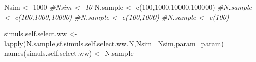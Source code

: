 \documentclass[
]{book}
\newenvironment{Shaded}{\begin{snugshade}}{\end{snugshade}}
\newcommand{\AttributeTok}[1]{\textcolor[rgb]{0.77,0.63,0.00}{#1}}
\newcommand{\CommentTok}[1]{\textcolor[rgb]{0.56,0.35,0.01}{\textit{#1}}}
\newcommand{\DecValTok}[1]{\textcolor[rgb]{0.00,0.00,0.81}{#1}}
\newcommand{\FunctionTok}[1]{\textcolor[rgb]{0.00,0.00,0.00}{#1}}
\newcommand{\NormalTok}[1]{#1}
\newcommand{\OtherTok}[1]{\textcolor[rgb]{0.56,0.35,0.01}{#1}}
\theoremstyle{definition}
\theoremstyle{definition}
\theoremstyle{definition}
\theoremstyle{definition}
\theoremstyle{remark}
\begin{document}
\begin{Shaded}
\begin{Highlighting}[]
\NormalTok{Nsim }\OtherTok{\textless{}{-}} \DecValTok{1000}
\CommentTok{\#Nsim \textless{}{-} 10}
\NormalTok{N.sample }\OtherTok{\textless{}{-}} \FunctionTok{c}\NormalTok{(}\DecValTok{100}\NormalTok{,}\DecValTok{1000}\NormalTok{,}\DecValTok{10000}\NormalTok{,}\DecValTok{100000}\NormalTok{)}
\CommentTok{\#N.sample \textless{}{-} c(100,1000,10000)}
\CommentTok{\#N.sample \textless{}{-} c(100,1000)}
\CommentTok{\#N.sample \textless{}{-} c(100)}

\NormalTok{simuls.self.select.ww }\OtherTok{\textless{}{-}} \FunctionTok{lapply}\NormalTok{(N.sample,sf.simuls.self.select.ww.N,}\AttributeTok{Nsim=}\NormalTok{Nsim,}\AttributeTok{param=}\NormalTok{param)}
\FunctionTok{names}\NormalTok{(simuls.self.select.ww) }\OtherTok{\textless{}{-}}\NormalTok{ N.sample}
\end{Highlighting}
\end{Shaded}
\end{document}
